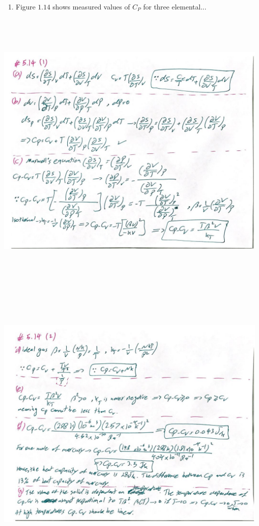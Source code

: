 \documentclass[fleqn]{article}
\begin{document}
\begin{enumerate}
\begin{enumerate}
      \item Figure $1.14$ shows measured values of $C_P$ for three elemental...

    \end{enumerate}

    \begin{center}
      \includegraphics[height=14cm, width=17cm]{514A.JPG}
    \end{center}

    \pagebreak

    \begin{center}
      \includegraphics[height=14cm, width=17cm]{514B.JPG}
    \end{center}

  \end{enumerate}
\end{document}
